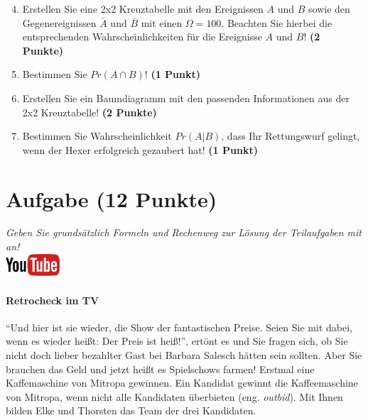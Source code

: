 \documentclass[a4paper, 9pt]{scrartcl}\usepackage[]{graphicx}\usepackage[]{xcolor}
\begin{document}
\begin{enumerate}
  \setcounter{enumi}{3}
\item Erstellen Sie eine 2x2 Kreuztabelle mit den Ereignissen $A$ und $B$
  sowie den Gegenereignissen $\bar{A}$ und $\bar{B}$ mit einen
  $\Omega = 100$. Beachten Sie hierbei die entsprechenden
  Wahrscheinlichkeiten f{\"u}r die Ereignisse $A$ und $B$! \textbf{(2 Punkte)}
\item Bestimmen Sie $Pr(A \cap B)$! \textbf{(1 Punkt)}
\item Erstellen Sie ein Baumdiagramm mit den passenden Informationen aus der 2x2
  Kreuztabelle! \textbf{(2 Punkte)}
\item Bestimmen Sie Wahrscheinlichkeit $Pr(A|B)$, dass Ihr Rettungswurf gelingt, wenn
  der Hexer erfolgreich gezaubert hat! \textbf{(1 Punkt)}
\end{enumerate}

  
\clearpage

\section{Aufgabe \hfill (12 Punkte)}

\textit{Geben Sie grunds{\"a}tzlich Formeln und Rechenweg zur L{\"o}sung der
  Teilaufgaben mit an!} \\[1Ex]

\hfill\href{https://youtu.be/9DQKaXdxT_g}{\includegraphics[width =
  2cm]{img/youtube}} %
\hspace{2Ex}

\paragraph{Retrocheck im TV}



"`Und hier ist sie wieder, die Show der fantastischen Preise. Seien Sie mit
dabei, wenn es wieder hei{\ss}t: Der Preis ist hei{\ss}!"', ert{\"o}nt es und Sie
fragen sich, ob Sie nicht doch lieber bezahlter Gast bei Barbara Salesch
h{\"a}tten sein sollten. Aber Sie brauchen das Geld und jetzt hei{\ss}t es
Spielschows farmen! Erstmal eine Kaffemaschine von Mitropa
gewinnen. Ein Kandidat gewinnt die Kaffeemaschine von Mitropa, wenn nicht alle
Kandidaten {\"u}berbieten (eng. \textit{outbid}). Mit Ihnen bilden
Elke und Thorsten das Team der drei Kandidaten.
\end{document}
